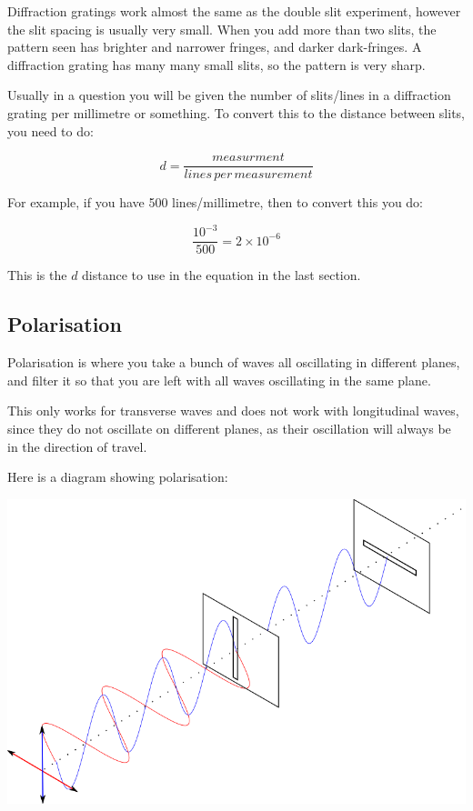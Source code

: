 \documentclass[a4paper, 12pt]{article}
\begin{document}
Diffraction gratings work almost the same as the double slit experiment, however the slit spacing is usually very small. When you add more than two slits, the pattern seen has brighter and narrower fringes, and darker dark-fringes. A diffraction grating has many many small slits, so the pattern is very sharp.

Usually in a question you will be given the number of slits/lines in a diffraction grating per millimetre or something. To convert this to the distance between slits, you need to do:

$$
d = \frac{measurment}{lines \, per \, measurement}
$$

For example, if you have 500 lines/millimetre, then to convert this you do:

$$
\frac{10^{-3}}{500} = 2 \times 10^{-6}
$$

This is the $d$ distance to use in the equation in the last section.

\subsection{Polarisation}

Polarisation is where you take a bunch of waves all oscillating in different planes, and filter it so that you are left with all waves oscillating in the same plane.

This only works for transverse waves and does not work with longitudinal waves, since they do not oscillate on different planes, as their oscillation will always be in the direction of travel.

Here is a diagram showing polarisation:

\includegraphics[width=\textwidth]{images/polarisation.png}
\end{document}

